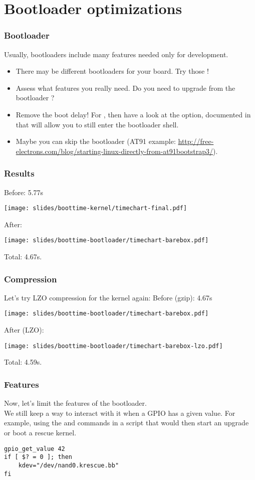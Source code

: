 \section{Bootloader optimizations}
\begin{frame}
\frametitle{Bootloader}
Usually, bootloaders include many features needed only for
development.
\begin{itemize}
	\item There may be different bootloaders for your board. Try
		those !
	\item Assess what features you really need. Do you need to
		upgrade from the bootloader ?
	\item Remove the boot delay! For , then have a look
		at the  option, documented in
		 that will allow you to still enter
		the bootloader shell.
	\item Maybe you can skip the bootloader (AT91 example: 
                \url{http://free-electrons.com/blog/starting-linux-directly-from-at91bootstrap3/}).
\end{itemize}
\end{frame}

\begin{frame}
\frametitle{Results}
Before: 5.77s
\begin{center}
    \texttt{[image: slides/boottime-kernel/timechart-final.pdf]}
\end{center}
After:
\begin{center}
    \texttt{[image: slides/boottime-bootloader/timechart-barebox.pdf]}
\end{center}
Total: 4.67s.
\end{frame}

\begin{frame}
\frametitle{Compression}
Let's try LZO compression for the kernel again:
Before (gzip): 4.67s
\begin{center}
    \texttt{[image: slides/boottime-bootloader/timechart-barebox.pdf]}
\end{center}
After (LZO):
\begin{center}
    \texttt{[image: slides/boottime-bootloader/timechart-barebox-lzo.pdf]}
\end{center}
Total: 4.59s.
\end{frame}

\begin{frame}[fragile]
\frametitle{Features}
Now, let's limit the features of the bootloader.\\
We still keep a way to interact with it when a GPIO has a given value.
For example, using the  and
 commands in a script that would then start an
upgrade or boot a rescue kernel.
\begin{block}{}
\begin{verbatim}
gpio_get_value 42
if [ $? = 0 ]; then
    kdev="/dev/nand0.krescue.bb"
fi
\end{verbatim}
\end{block}
\end{frame}

